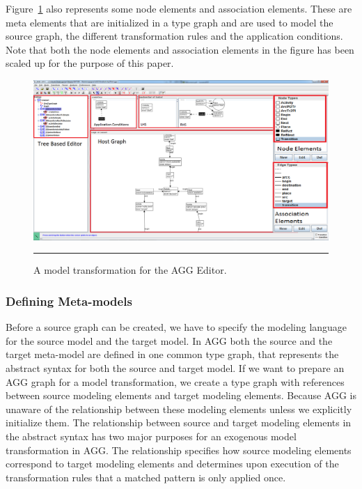 Figure~\ref{fig:AGGScreen} also represents some node elements and association
elements. These are meta elements that are initialized in a type graph and
are used to model the source graph, the different transformation rules and the
application conditions. Note that both the node elements and association
elements in the figure has been scaled up for the purpose of this paper.

\begin{figure}[H]
  \centering
    \includegraphics[scale=0.3]{figures/AGGscreen.png}
    \rule{35em}{0.5pt}
  \caption[Graphical Editor for AGG]
  {A model transformation for the AGG Editor.}
  \label{fig:AGGScreen}
\end{figure}

\subsubsection*{Defining Meta-models}

Before a source graph can be created, we have to specify the modeling
language for the source model and the target model. In AGG both the source and the
target meta-model are defined in one common type graph, that
represents the abstract syntax for both the source and target model. If we want
to prepare an AGG graph for a model transformation, we create a type graph with
references between source modeling elements and target modeling elements.
Because AGG is unaware of the relationship between these modeling elements
unless we explicitly initialize them. The relationship between source and
target modeling elements in the abstract syntax has two major purposes for an
exogenous model transformation in AGG. The relationship specifies how source
modeling elements correspond to target modeling elements and determines upon
execution of the transformation rules that a matched pattern is only applied
once.

